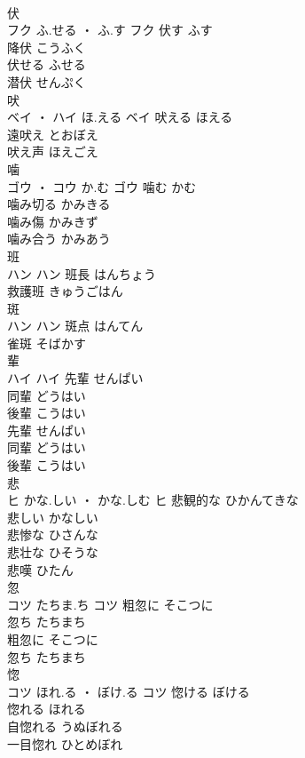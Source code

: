 \documentclass[8pt]{extreport}
\begin{document}
\begin{CJK}{UTF8}{min}
\\	伏	
\\	フク	ふ.せる ・ ふ.す	フク	伏す	ふす	
\\	降伏	こうふく	
\\	伏せる	ふせる	
\\	潜伏	せんぷく	
\\	吠	
\\	ベイ ・ ハイ	ほ.える	ベイ	吠える	ほえる	
\\	遠吠え	とおぼえ	
\\	吠え声	ほえごえ	
\\	噛	
\\	ゴウ ・ コウ	か.む	ゴウ	噛む	かむ	
\\	噛み切る	かみきる	
\\	噛み傷	かみきず	
\\	噛み合う	かみあう	
\\	班	
\\	ハン		ハン	班長	はんちょう	
\\	救護班	きゅうごはん	
\\	斑	
\\	ハン		ハン	斑点	はんてん	
\\	雀斑	そばかす	
\\	輩	
\\	ハイ		ハイ	先輩	せんぱい	
\\	同輩	どうはい	
\\	後輩	こうはい	
\\	先輩	せんぱい	
\\	同輩	どうはい	
\\	後輩	こうはい	
\\	悲	
\\	ヒ	かな.しい ・ かな.しむ	ヒ	悲観的な	ひかんてきな	
\\	悲しい	かなしい	
\\	悲惨な	ひさんな	
\\	悲壮な	ひそうな	
\\	悲嘆	ひたん	
\\	忽	
\\	コツ	たちま.ち	コツ	粗忽に	そこつに	
\\	忽ち	たちまち	
\\	粗忽に	そこつに	
\\	忽ち	たちまち	
\\	惚	
\\	コツ	ほれ.る ・ ぼけ.る	コツ	惚ける	ぼける	
\\	惚れる	ほれる	
\\	自惚れる	うぬぼれる	
\\	一目惚れ	ひとめぼれ	

\end{CJK}
\end{document}

